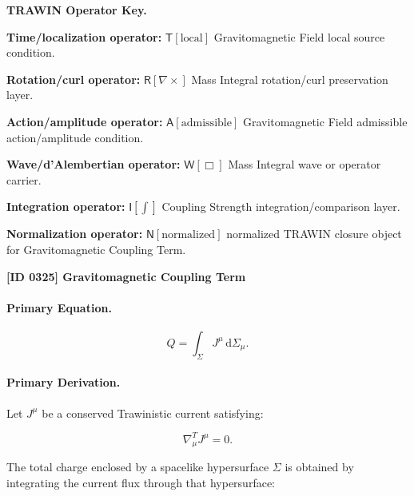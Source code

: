 \par\vspace{0.45\baselineskip}
\noindent\begin{minipage}[t]{\linewidth}
\begingroup
\small
\raggedright
\textbf{TRAWIN Operator Key.}\par
\noindent\textbf{Time/localization operator:} $\mathsf{T}\!\left[\mathrm{local}\right]$ Gravitomagnetic Field local source condition.\par
\noindent\textbf{Rotation/curl operator:} $\mathsf{R}\!\left[\nabla\times\right]$ Mass Integral rotation/curl preservation layer.\par
\noindent\textbf{Action/amplitude operator:} $\mathsf{A}\!\left[\mathrm{admissible}\right]$ Gravitomagnetic Field admissible action/amplitude condition.\par
\noindent\textbf{Wave/d'Alembertian operator:} $\mathsf{W}\!\left[\Box\right]$ Mass Integral wave or operator carrier.\par
\noindent\textbf{Integration operator:} $\mathsf{I}\!\left[\int\right]$ Coupling Strength integration/comparison layer.\par
\noindent\textbf{Normalization operator:} $\mathsf{N}\!\left[\mathrm{normalized}\right]$ normalized TRAWIN closure object for Gravitomagnetic Coupling Term.\par
\endgroup
\end{minipage}

\clearpage
\noindent\textbf{[ID 0325] Gravitomagnetic Coupling Term}\par
\vspace{0.35em}
\paragraph{Primary Equation.}
\begin{equation}
Q
=
\int_{\Sigma}
J^\mu
\,\mathrm{d}\Sigma_\mu .
\end{equation}

\paragraph{Primary Derivation.}
Let $J^\mu$ be a conserved Trawinistic current satisfying:

\begin{equation}
\nabla^T_\mu J^\mu = 0 .
\end{equation}

The total charge enclosed by a spacelike hypersurface $\Sigma$ is obtained by integrating the current flux through that hypersurface:

